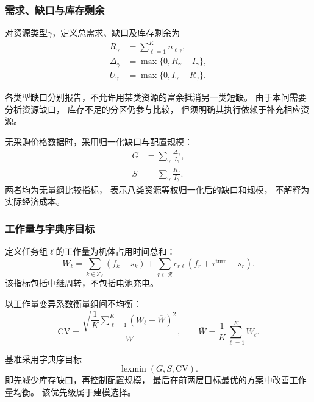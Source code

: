 \documentclass[bwprint]{gmcmthesis}
\begin{document}
\subsubsection{需求、缺口与库存剩余}

对资源类型$\gamma$，定义总需求、缺口及库存剩余为
\begin{align}
R_\gamma&=\sum_{\ell=1}^{K}n_{\ell\gamma},\\
\Delta_\gamma&=\max\{0,R_\gamma-I_\gamma\},\\
U_\gamma&=\max\{0,I_\gamma-R_\gamma\}.
\end{align}

各类型缺口分别报告，不允许用某类资源的富余抵消另一类短缺。
由于本问需要分析资源缺口，
库存不足的分区仍参与比较，
但须明确其执行依赖于补充相应资源。

无采购价格数据时，采用归一化缺口与配置规模：
\begin{align}
G&=\sum_{\gamma}\frac{\Delta_\gamma}{I_\gamma},\\
S&=\sum_{\gamma}\frac{R_\gamma}{I_\gamma}.
\end{align}
两者均为无量纲比较指标，
表示八类资源等权归一化后的缺口和规模，
不解释为实际经济成本。

\subsubsection{工作量与字典序目标}

定义任务组$\ell$的工作量为机体占用时间总和：
\begin{equation}
W_\ell
=
\sum_{k\in\mathcal{T}_\ell}(f_k-s_k)
+
\sum_{r\in\mathcal{R}}
c_{r\ell}(f_r+\tau^{\mathrm{turn}}-s_r).
\end{equation}
该指标包括中继周转，不包括电池充电。

以工作量变异系数衡量组间不均衡：
\begin{equation}
\mathrm{CV}
=
\frac{
\sqrt{\dfrac{1}{K}\sum_{\ell=1}^{K}(W_\ell-\overline{W})^2}
}{\overline{W}},
\qquad
\overline{W}=\frac{1}{K}\sum_{\ell=1}^{K}W_\ell.
\end{equation}

基准采用字典序目标
\begin{equation}
\operatorname{lexmin}(G,S,\mathrm{CV}).
\end{equation}
即先减少库存缺口，再控制配置规模，
最后在前两层目标最优的方案中改善工作量均衡。
该优先级属于建模选择。
\end{document}
